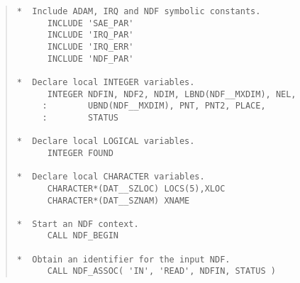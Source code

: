 \documentclass[twoside,11pt]{article}
\renewcommand{\_}{\texttt{\symbol{95}}}
\begin{document}
\begin{quote}
\begin{tabbing} %

\verb#*  Include ADAM, IRQ and NDF symbolic constants.       #\\
\verb#      INCLUDE 'SAE_PAR'                                #\\
\verb#      INCLUDE 'IRQ_PAR'                                #\\
\verb#      INCLUDE 'IRQ_ERR'                                #\\
\verb#      INCLUDE 'NDF_PAR'                                #\\
\verb#                                                       #\\
\verb#*  Declare local INTEGER variables.                    #\\
\verb#      INTEGER NDFIN, NDF2, NDIM, LBND(NDF__MXDIM), NEL,#\\
\verb#     :        UBND(NDF__MXDIM), PNT, PNT2, PLACE,      #\\
\verb#     :        STATUS                                   #\\
\verb#                                                       #\\
\verb#*  Declare local LOGICAL variables.                    #\\
\verb#      INTEGER FOUND                                    #\\
\verb#                                                       #\\
\verb#*  Declare local CHARACTER variables.                  #\\
\verb#      CHARACTER*(DAT__SZLOC) LOCS(5),XLOC              #\\
\verb#      CHARACTER*(DAT__SZNAM) XNAME                     #\\
\verb#                                                       #\\
\verb#*  Start an NDF context.                               #\\
\verb#      CALL NDF_BEGIN                                   #\\
\verb#                                                       #\\
\verb#*  Obtain an identifier for the input NDF.             #\\
\verb#      CALL NDF_ASSOC( 'IN', 'READ', NDFIN, STATUS )    #\\

\end{tabbing}
\end{quote}
\end{document}
